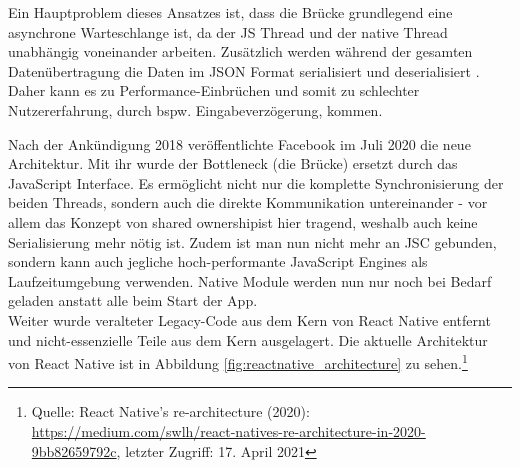 \noindent
Ein Hauptproblem dieses Ansatzes ist, dass die Brücke grundlegend eine asynchrone Warteschlange ist, da der JS Thread und der native Thread unabhängig voneinander arbeiten. Zusätzlich werden während der gesamten Datenübertragung die Daten im JSON Format serialisiert und deserialisiert .
Daher kann es zu Performance-Einbrüchen und somit zu schlechter Nutzererfahrung, durch bspw. Eingabeverzögerung, kommen.

\noindent
Nach der Ankündigung 2018 veröffentlichte Facebook im Juli 2020 die neue Architektur. Mit ihr wurde der Bottleneck (die Brücke) ersetzt durch das JavaScript Interface.
Es ermöglicht nicht nur die komplette Synchronisierung der beiden Threads, sondern auch die direkte Kommunikation untereinander - vor allem das Konzept von \glqq shared ownership\grqq ist hier tragend, weshalb auch keine Serialisierung mehr nötig ist.
Zudem  ist man nun nicht mehr an JSC gebunden, sondern kann auch jegliche hoch-performante JavaScript Engines als Laufzeitumgebung verwenden.
Native Module werden nun nur noch bei Bedarf geladen anstatt alle beim Start der App.\\
Weiter wurde veralteter Legacy-Code aus dem Kern von React Native entfernt und nicht-essenzielle Teile aus dem Kern ausgelagert. Die aktuelle Architektur von React Native ist  in Abbildung \ref{fig:reactnative_architecture} zu sehen.\footnote{Quelle: React Native's re-architecture (2020): \url{https://medium.com/swlh/react-natives-re-architecture-in-2020-9bb82659792c}, letzter Zugriff: 17. April 2021}

